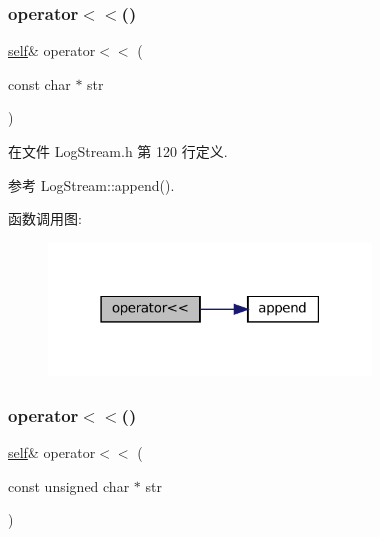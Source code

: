 \subsubsection{\texorpdfstring{operator$<$$<$()}{operator<<()}\hspace{0.1cm}{\footnotesize\ttfamily [14/18]}}
{\footnotesize\ttfamily \hyperlink{classmuduo_1_1LogStream_a85e87a809801549b949fc3f7f8c816bd}{self}\& operator$<$$<$ (\begin{DoxyParamCaption}\item[{const char $\ast$}]{str }\end{DoxyParamCaption})\hspace{0.3cm}{\ttfamily [inline]}}



在文件 Log\+Stream.\+h 第 120 行定义.



参考 Log\+Stream\+::append().

函数调用图\+:
\nopagebreak
\begin{figure}[H]
\begin{center}
\leavevmode
\includegraphics[width=243pt]{classmuduo_1_1LogStream_a9f2b169c885db34149ac9eccb84fd5a7_cgraph}
\end{center}
\end{figure}
\mbox{\label{classmuduo_1_1LogStream_a910024b9a941ed5cd3a44fa74cbd3204}} 
\subsubsection{\texorpdfstring{operator$<$$<$()}{operator<<()}\hspace{0.1cm}{\footnotesize\ttfamily [15/18]}}
{\footnotesize\ttfamily \hyperlink{classmuduo_1_1LogStream_a85e87a809801549b949fc3f7f8c816bd}{self}\& operator$<$$<$ (\begin{DoxyParamCaption}\item[{const unsigned char $\ast$}]{str }\end{DoxyParamCaption})\hspace{0.3cm}{\ttfamily [inline]}}



